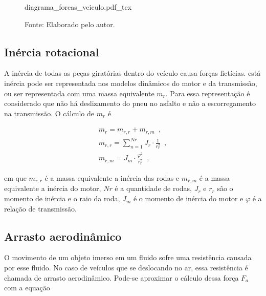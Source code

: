 \begin{figure}[h]
	\centering
	\caption{Diagrama de forças de um veículo em movimento}
	\label{fig:diag_forcas_veiculo}
	\begin{normalsize}
		{diagrama_forcas_veiculo.pdf_tex}
	\end{normalsize}
	\caption*{\footnotesize Fonte: Elaborado pelo autor.}
\end{figure}

\subsection{Inércia rotacional}

A inércia de todas as peças giratórias dentro do veículo causa forças fictícias. 
está inércia pode ser representada nos modelos dinâmicos do motor e da transmissão, ou ser representada com uma massa equivalente $m_r$.
Para essa representação é considerado que não há deslizamento do pneu no asfalto e não a escorregamento na transmissão. O cálculo de $m_r$ é 

\begin{subequations}
	\label{eq:mr}
	\begin{align}
		m_r = m_{r,r} + m_{r,m} \enspace, \label{eq:mr1} \\
		m_{r,r} = \sum_{n=1}^{Nr} J_r \cdot \frac{1}{r_r^2} \enspace, \label{eq:mr2} \\
		m_{r,m} = J_m \cdot \frac{\varphi^2}{r_r^2} \enspace, \label{eq:mr3}
	\end{align}
\end{subequations}

em que $m_{r,r}$ é a massa equivalente a inércia das rodas e $m_{r,m}$ é a massa equivalente a inércia do motor, $Nr$ é a quantidade de rodas, 
$J_r$ e $r_r$ são o momento de inércia e o raio da roda, $J_m$ é o momento de inércia do motor e 
$\varphi$ é a relação de transmissão.\cite{book:guzzella2012vehicle}

\subsection{Arrasto aerodinâmico}
\label{subsec:arrasto_aerodinamico}

O movimento de um objeto imerso em um fluido sofre uma resistência causada por esse fluido. No
caso de veículos que se deslocando no ar, essa
resistência é chamada de arrasto aerodinâmico.
Pode-se aproximar o cálculo dessa força $F_{a}$ com a equação

